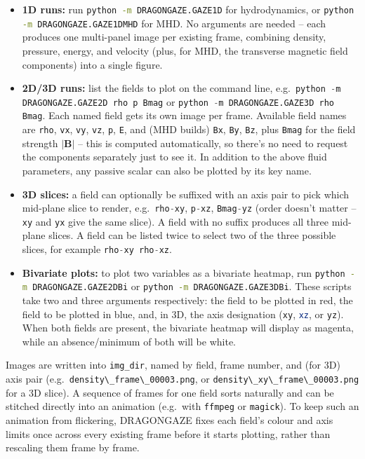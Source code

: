 \documentclass[11pt]{report}
\newcommand{\bash}[1]{\lstinline[language=bash]{#1}}
\newcommand{\py}[1]{\lstinline[language=Python]{#1}}
\begin{document}
\begin{itemize}
\item \textbf{1D runs:} run \bash{python -m DRAGONGAZE.GAZE1D} for hydrodynamics, or \bash{python -m DRAGONGAZE.GAZE1DMHD} for MHD. No arguments are needed -- each produces one multi-panel image per existing frame, combining density, pressure, energy, and velocity (plus, for MHD, the transverse magnetic field components) into a single figure.
\item \textbf{2D/3D runs:} list the fields to plot on the command line, e.g.\ \py{python -m DRAGONGAZE.GAZE2D rho p Bmag} or \py{python -m DRAGONGAZE.GAZE3D rho Bmag}. Each named field gets its own image per frame. Available field names are \py{rho}, \py{vx}, \py{vy}, \py{vz}, \py{p}, \py{E}, and (MHD builds) \py{Bx}, \py{By}, \py{Bz}, plus \py{Bmag} for the field strength $|\mathbf{B}|$ -- this is computed automatically, so there's no need to request the components separately just to see it. 
In addition to the above fluid parameters, any passive scalar can also be plotted by its key name.

\item \textbf{3D slices:} a field can optionally be suffixed with an axis pair to pick which mid-plane slice to render, e.g.\ \py{rho-xy}, \py{p-xz}, \py{Bmag-yz} (order doesn't matter -- \py{xy} and \py{yx} give the same slice). A field with no suffix produces all three mid-plane slices. A field can be listed twice to select two of the three possible slices, for example \py{rho-xy rho-xz}.

\item \textbf{Bivariate plots:} to plot two variables as a bivariate heatmap, run \bash{python -m DRAGONGAZE.GAZE2DBi} or \bash{python -m DRAGONGAZE.GAZE3DBi}. These scripts take two and three arguments respectively: the field to be plotted in red, the field to be plotted in blue, and, in 3D, the axis designation (\bash{xy}, \bash{xz}, or \bash{yz}). When both fields are present, the bivariate heatmap will display as magenta, while an absence/minimum of both will be white.


\end{itemize}

Images are written into \py{img_dir}, named by field, frame number, and (for 3D) axis pair (e.g.\ \py{density\_frame\_00003.png}, or \py{density\_xy\_frame\_00003.png} for a 3D slice).  A sequence of frames for one field sorts naturally and can be stitched directly into an animation (e.g.\ with \bash{ffmpeg} or \bash{magick}). To keep such an animation from flickering, DRAGONGAZE fixes each field's colour and axis limits once across every existing frame before it starts plotting, rather than rescaling them frame by frame.
\end{document}
